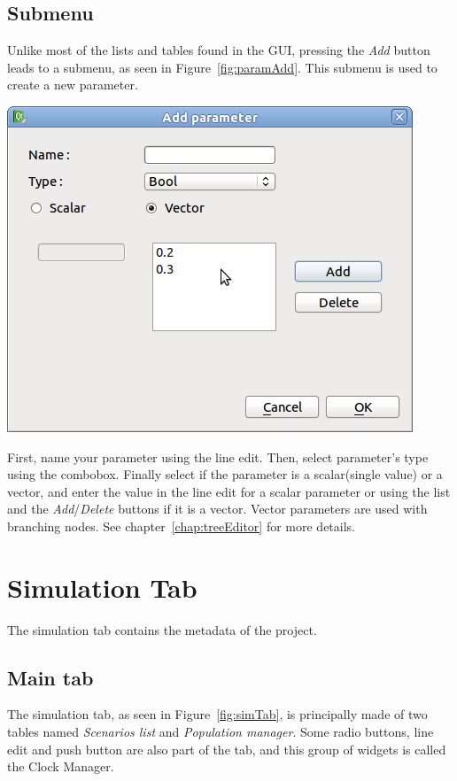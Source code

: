 \documentclass[a4paper,11pt]{report}
\begin{document}
\subsection{Submenu}
Unlike most of the lists and tables found in the GUI, pressing the \emph{Add} button leads to a submenu, as seen in Figure~\ref{fig:paramAdd}. This submenu is used to create a new parameter.

\begin{center}
\includegraphics[scale=0.3]{Pictures/Parameters/AddParam.png}
\label{fig:paramAdd}
\end{center}

First, name your parameter using the line edit. Then, select parameter's type using the combobox. Finally select if the parameter is a scalar(single value) or a vector, and enter the value in the line edit for a scalar parameter or using the list and the \emph{Add}/\emph{Delete} buttons if it is a vector. Vector parameters are used with branching nodes. See chapter~\ref{chap:treeEditor} for more details.

\section{Simulation Tab}
The simulation tab contains the metadata of the project.

\subsection{Main tab}
The simulation tab, as seen in Figure~\ref{fig:simTab}, is principally made of two tables named \emph{Scenarios list} and \emph{Population manager}. Some radio buttons, line edit and push button are also part of the tab, and this group of widgets is called the Clock Manager.
\end{document}
